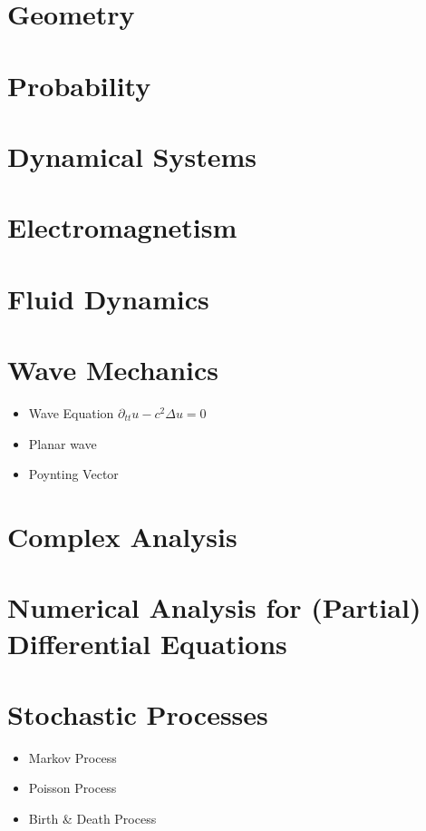 \documentclass[10pt]{article}
\begin{document}
\section{Geometry}
\section{Probability}
\section{Dynamical Systems}
\section{Electromagnetism}
\section{Fluid Dynamics}
\section{Wave Mechanics}
	\begin{itemize}
	\item Wave Equation $\partial_{tt} u-c^2\Delta u=0$
	\item Planar wave
	\item Poynting Vector
	\end{itemize}
\section{Complex Analysis}
\section{Numerical Analysis for (Partial) Differential Equations}
\section{Stochastic Processes}
\begin{itemize}
	\item Markov Process
	\item Poisson Process
	\item Birth \& Death Process
\end{itemize}
\end{document}
